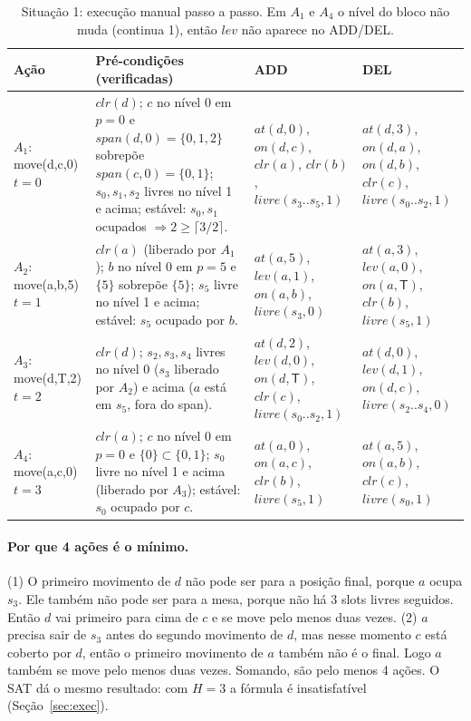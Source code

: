 \documentclass[11pt,a4paper]{article}
\newcommand{\clr}{\mathit{clr}}
\newcommand{\at}{\mathit{at}}
\newcommand{\lev}{\mathit{lev}}
\newcommand{\livre}{\mathit{livre}}
\newcommand{\on}{\mathit{on}}
\newcommand{\spn}{\mathit{span}}
\newcommand{\mesaT}{\mathsf{T}}
\begin{document}
\begin{table}[H]
\centering\small
\renewcommand{\arraystretch}{1.25}
\begin{tabularx}{\textwidth}{@{}p{2.3cm} X X X@{}}
\toprule
Ação & Pré-condições (verificadas) & ADD & DEL\\
\midrule
$A_1$: move(d,c,0)\newline $t=0$ &
$\clr(d)$; $c$ no nível 0 em $p{=}0$ e $\spn(d,0)=\{0,1,2\}$ sobrepõe
$\spn(c,0)=\{0,1\}$; $s_0,s_1,s_2$ livres no nível 1 e acima;
estável: $s_0,s_1$ ocupados $\Rightarrow 2\ge\lceil 3/2\rceil$. &
$\at(d,0)$, $\on(d,c)$, $\clr(a)$, $\clr(b)$, $\livre(s_3..s_5,1)$ &
$\at(d,3)$, $\on(d,a)$, $\on(d,b)$, $\clr(c)$, $\livre(s_0..s_2,1)$\\
\midrule
$A_2$: move(a,b,5)\newline $t=1$ &
$\clr(a)$ (liberado por $A_1$); $b$ no nível 0 em $p{=}5$ e $\{5\}$ sobrepõe $\{5\}$;
$s_5$ livre no nível 1 e acima; estável: $s_5$ ocupado por $b$. &
$\at(a,5)$, $\lev(a,1)$, $\on(a,b)$, $\livre(s_3,0)$ &
$\at(a,3)$, $\lev(a,0)$, $\on(a,\mesaT)$, $\clr(b)$, $\livre(s_5,1)$\\
\midrule
$A_3$: move(d,T,2)\newline $t=2$ &
$\clr(d)$; $s_2,s_3,s_4$ livres no nível 0 ($s_3$ liberado por $A_2$) e acima
($a$ está em $s_5$, fora do span). &
$\at(d,2)$, $\lev(d,0)$, $\on(d,\mesaT)$, $\clr(c)$, $\livre(s_0..s_2,1)$ &
$\at(d,0)$, $\lev(d,1)$, $\on(d,c)$, $\livre(s_2..s_4,0)$\\
\midrule
$A_4$: move(a,c,0)\newline $t=3$ &
$\clr(a)$; $c$ no nível 0 em $p{=}0$ e $\{0\}\subset\{0,1\}$; $s_0$ livre no nível 1
e acima (liberado por $A_3$); estável: $s_0$ ocupado por $c$. &
$\at(a,0)$, $\on(a,c)$, $\clr(b)$, $\livre(s_5,1)$ &
$\at(a,5)$, $\on(a,b)$, $\clr(c)$, $\livre(s_0,1)$\\
\bottomrule
\end{tabularx}
\caption{Situação 1: execução manual passo a passo. Em $A_1$ e $A_4$ o nível do bloco não
muda (continua 1), então $\lev$ não aparece no ADD/DEL.}
\label{tab:passos}
\end{table}

\paragraph{Por que 4 ações é o mínimo.} (1) O primeiro movimento de $d$ não pode
ser para a posição final, porque $a$ ocupa $s_3$. Ele também não pode ser para a
mesa, porque não há 3 slots livres seguidos. Então $d$ vai primeiro para cima de
$c$ e se move pelo menos duas vezes. (2) $a$ precisa sair de $s_3$ antes do
segundo movimento de $d$, mas nesse momento $c$ está coberto por $d$, então o
primeiro movimento de $a$ também não é o final. Logo $a$ também se move pelo menos
duas vezes. Somando, são pelo menos 4 ações. O SAT dá o mesmo resultado: com $H=3$ a
fórmula é insatisfatível
(Seção~\ref{sec:exec}).
\end{document}
